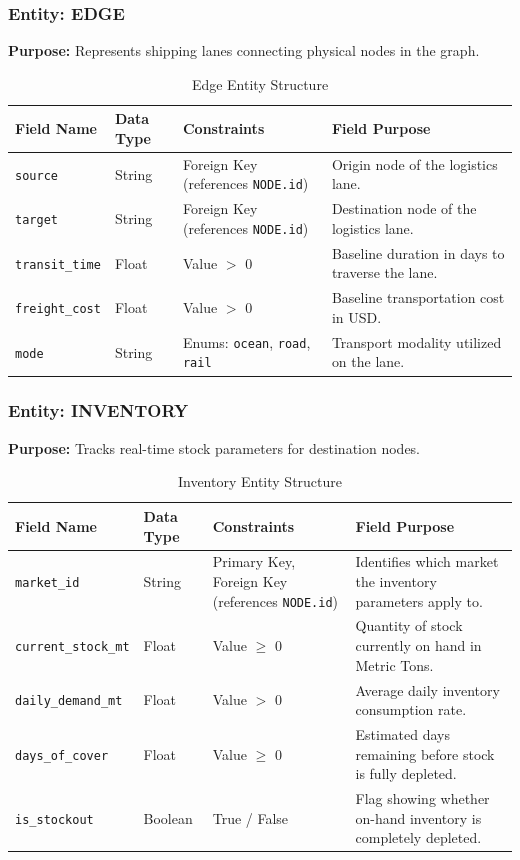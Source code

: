 \subsubsection{Entity: EDGE}
\textbf{Purpose:} Represents shipping lanes connecting physical nodes in the graph.

\begin{table}[H]
\centering
\begin{tabularx}{\textwidth}{|l|l|>{\hsize=0.8\hsize}X|>{\hsize=1.2\hsize}X|}
\hline
\textbf{Field Name} & \textbf{Data Type} & \textbf{Constraints} & \textbf{Field Purpose} \\ \hline
\texttt{source} & String & Foreign Key (references \texttt{NODE.id}) & Origin node of the logistics lane. \\ \hline
\texttt{target} & String & Foreign Key (references \texttt{NODE.id}) & Destination node of the logistics lane. \\ \hline
\texttt{transit\_time} & Float & Value $>$ 0 & Baseline duration in days to traverse the lane. \\ \hline
\texttt{freight\_cost} & Float & Value $>$ 0 & Baseline transportation cost in USD. \\ \hline
\texttt{mode} & String & Enums: \texttt{ocean}, \texttt{road}, \texttt{rail} & Transport modality utilized on the lane. \\ \hline
\end{tabularx}
\caption{Edge Entity Structure}
\label{tab:edge_structure}
\end{table}

\subsubsection{Entity: INVENTORY}
\textbf{Purpose:} Tracks real-time stock parameters for destination nodes.

\begin{table}[H]
\centering
\begin{tabularx}{\textwidth}{|l|l|>{\hsize=0.8\hsize}X|>{\hsize=1.2\hsize}X|}
\hline
\textbf{Field Name} & \textbf{Data Type} & \textbf{Constraints} & \textbf{Field Purpose} \\ \hline
\texttt{market\_id} & String & Primary Key, Foreign Key (references \texttt{NODE.id}) & Identifies which market the inventory parameters apply to. \\ \hline
\texttt{current\_stock\_mt} & Float & Value $\geq$ 0 & Quantity of stock currently on hand in Metric Tons. \\ \hline
\texttt{daily\_demand\_mt} & Float & Value $>$ 0 & Average daily inventory consumption rate. \\ \hline
\texttt{days\_of\_cover} & Float & Value $\geq$ 0 & Estimated days remaining before stock is fully depleted. \\ \hline
\texttt{is\_stockout} & Boolean & True / False & Flag showing whether on-hand inventory is completely depleted. \\ \hline
\end{tabularx}
\caption{Inventory Entity Structure}
\label{tab:inventory_structure}
\end{table}

